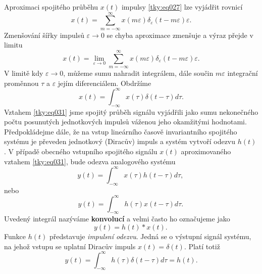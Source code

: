       Aproximaci spojitého průběhu $x(t)$ impulsy \ref{tky:eq027} lze vyjádřit rovnicí
      \begin{equation}\label{tky:eq029}
        x(t)=\sum_{m=-\infty}^\infty x(m\varepsilon)\delta_\varepsilon(t-m\varepsilon)\varepsilon.
      \end{equation}
      Zmenšování šířky impulsů $\varepsilon\rightarrow0$ se chyba aproximace zmenšuje a výraz přejde
      v limitu
      \begin{equation}\label{tky:eq030}
        x(t) = \lim_{\varepsilon\rightarrow0}
               \sum_{m=-\infty}^\infty x(m\varepsilon)\delta_\varepsilon(t-m\varepsilon)\varepsilon.        
      \end{equation}
      V limitě kdy $\varepsilon\rightarrow0$, můžeme sumu nahradit integrálem, dále součin
      $m\varepsilon$ integrační proměnnou $\tau$ a $\varepsilon$ jejím diferenciálem. Obdržíme
      \begin{equation}\label{tky:eq031}
        x(t) = \int_{-\infty}^{\infty}x(\tau)\delta(t-\tau)d\tau .
      \end{equation}
      Vztahem \ref{tky:eq031} jsme spojitý průběh signálu vyjádřili jako sumu
      nekonečného počtu posunutých jednotkových impulsů váženou jeho okamžitými hodnotami.
      Předpokládejme dále, že na vstup lineárního časově invariantního spojitého systému je převeden
      jednotkový (Diracův) impuls a systém vytvoří odezvu $h(t)$. V případě obecného vstupního
      spojitého signálu $x(t)$ aproximovaného vztahem \ref{tky:eq031}, bude odezva
      analogového systému
      \begin{equation}\label{tky:eq032}
        \boxed{y(t) = \int_{-\infty}^{\infty}x(\tau)h(t-\tau)d\tau, \,}
      \end{equation}
      nebo
      \begin{equation}\label{tky:eq033}
        \boxed{y(t) = \int_{-\infty}^{\infty}h(\tau)x(t-\tau)d\tau.\,}
      \end{equation}
      Uvedený integrál nazýváme \textbf{konvolucí} a velmi často ho označujeme jako 
      \begin{equation}\label{tky:eq034}
        \boxed{y(t) = h(t)*x(t).\,}
      \end{equation}
      Funkce $h(t)$ představuje \emph{impulsní odezvu}. Jedná se o výstupní signál systému, na 
      jehož vstupu se uplatní Diracův impuls $x(t)=\delta(t)$. Platí totiž
      \begin{equation}\label{tky:eq035}
        y(t) = \int_{-\infty}^{\infty}h(\tau)\delta(t-\tau)d\tau = h(t) . 
      \end{equation}     
